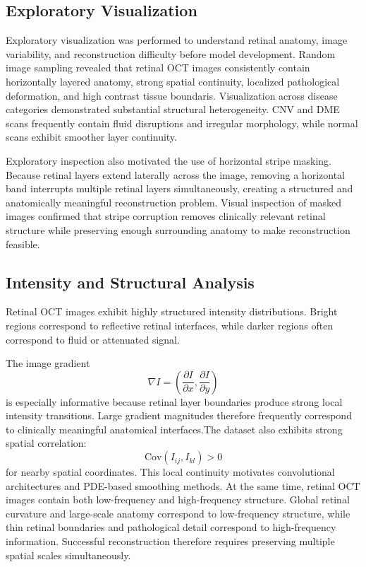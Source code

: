 \documentclass[12pt,oneside]{article}
\newcommand{\Cov}{\mathrm{Cov}}
\begin{document}
\subsection{Exploratory Visualization}

Exploratory visualization was performed to understand retinal anatomy, image variability, and reconstruction difficulty before model development.
Random image sampling revealed that retinal OCT images consistently contain horizontally layered anatomy, strong spatial continuity, localized pathological deformation, and high contrast tissue boundaris.
Visualization across disease categories demonstrated substantial structural heterogeneity. CNV and DME scans frequently contain fluid disruptions and irregular morphology, while normal scans exhibit smoother layer continuity.

Exploratory inspection also motivated the use of horizontal stripe masking. Because retinal layers extend laterally across the image, removing a horizontal band interrupts multiple retinal layers simultaneously, creating a structured and anatomically meaningful reconstruction problem.
Visual inspection of masked images confirmed that stripe corruption removes clinically relevant retinal structure while preserving enough surrounding anatomy to make reconstruction feasible.

\subsection*{Intensity and Structural Analysis}

Retinal OCT images exhibit highly structured intensity distributions. Bright regions correspond to reflective retinal interfaces, while darker regions often correspond to fluid or attenuated signal.

The image gradient
\[
\nabla I
=
\left(
\frac{\partial I}{\partial x},
\frac{\partial I}{\partial y}
\right)
\]
is especially informative because retinal layer boundaries produce strong local intensity transitions. Large gradient magnitudes therefore frequently correspond to clinically meaningful anatomical interfaces.The dataset also exhibits strong spatial correlation:
\[
\Cov(I_{ij}, I_{kl}) > 0
\]
for nearby spatial coordinates. This local continuity motivates convolutional architectures and PDE-based smoothing methods.
At the same time, retinal OCT images contain both low-frequency and high-frequency structure. Global retinal curvature and large-scale anatomy correspond to low-frequency structure, while thin retinal boundaries and pathological detail correspond to high-frequency information. Successful reconstruction therefore requires preserving multiple spatial scales simultaneously.
\end{document}
